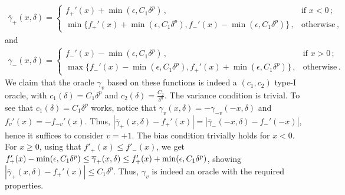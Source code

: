 \begin{align*}
\overline{\gamma}_+(x,\delta) = 
	\begin{cases}
	f_+'(x) + \min(\epsilon,C_1\delta^p)\,, & \text{if } x<0\,; \\
	\min\big\{f_+'(x) + \min(\epsilon,C_1\delta^p), f_-'(x) - \min(\epsilon,C_1\delta^p)\big\}\,, & \text{otherwise}\,,
	\end{cases}
\end{align*}
and
\begin{align*}
\overline{\gamma}_-(x,\delta) = 
	\begin{cases}
	f_-'(x) - \min(\epsilon,C_1\delta^p)\,, & \text{if } x>0\,; \\
	\max\big\{f_-'(x) - \min(\epsilon,C_1\delta^p), f_+'(x) + \min(\epsilon,C_1\delta^p)\big\}\,, & \text{otherwise}\,.
	\end{cases}
\end{align*}
We claim that the oracle $\gamma_v$ based on these functions
 is indeed a $(c_1,c_2)$ type-I oracle, with $c_1(\delta)=C_1\delta^p$ and $c_2(\delta)=\frac{C_2}{\delta^q}$. The variance condition is trivial.
To see that $c_1(\delta) = C_1\delta^p$ works, 
notice that $\gamma_v(x,\delta) = -\gamma_{-v}(-x,\delta)$ and $f_v'(x) = -f_{-v}'(x)$. Thus,
$|\overline{\gamma}_+(x,\delta)-f_+'(x)| = |\overline{\gamma}_-(-x,\delta)-f_-'(-x)|$, hence it suffices to consider $v=+1$.
The bias condition trivially holds for $x<0$. For $x\ge 0$, using that $f'_+(x) \le f'_-(x)$, we get
$f'_+(x) - \min(\epsilon,C_1\delta^p) \le \overline{\gamma}_+(x,\delta) \le f'_+(x) + \min(\epsilon,C_1\delta^p)$, showing 
$|\overline{\gamma}_+(x,\delta)-f_+'(x)|  \le C_1 \delta^p$.
Thus, $\gamma_v$ is indeed an oracle with the required properties.



